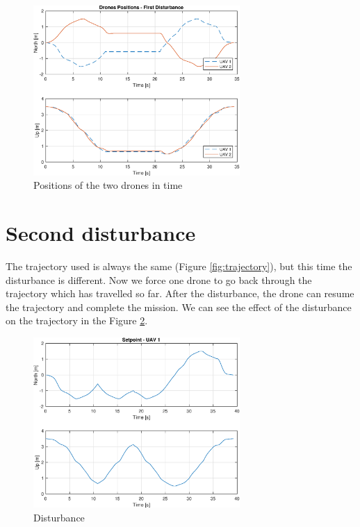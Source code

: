 \begin{figure}
\centering
\includegraphics[width=0.7\textwidth]{chapters/chapter-04/figures/overlapped_1.eps}
\caption{Positions of the two drones in time}
\label{fig:overlapped_1}
\end{figure}


\section{Second disturbance}
The trajectory used is always the same (Figure \ref{fig:trajectory}), but this time
the disturbance is different. Now we force one drone to go back through the trajectory
which has travelled so far.
After the disturbance, the drone can resume the trajectory and complete the mission.
We can see the effect of the disturbance on the trajectory in the Figure \ref{fig:disturbance_2}.

\begin{figure}
\centering
\includegraphics[width=0.7\textwidth]{chapters/chapter-04/figures/pos_2.eps}
\caption{Disturbance}
\label{fig:disturbance_2}
\end{figure}

